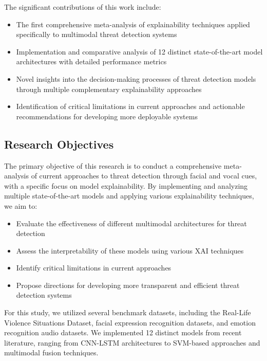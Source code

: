 \documentclass[conference,compsoc]{IEEEtran}
\begin{document}
The significant contributions of this work include:
\begin{itemize}
    \item The first comprehensive meta-analysis of explainability techniques applied specifically to multimodal threat detection systems
    \item Implementation and comparative analysis of 12 distinct state-of-the-art model architectures with detailed performance metrics
    \item Novel insights into the decision-making processes of threat detection models through multiple complementary explainability approaches
    \item Identification of critical limitations in current approaches and actionable recommendations for developing more deployable systems
\end{itemize}

\subsection{Research Objectives}
The primary objective of this research is to conduct a comprehensive meta-analysis of current approaches to threat detection through facial and vocal cues, with a specific focus on model explainability. By implementing and analyzing multiple state-of-the-art models and applying various explainability techniques, we aim to:

\begin{itemize}
    \item Evaluate the effectiveness of different multimodal architectures for threat detection
    \item Assess the interpretability of these models using various XAI techniques
    \item Identify critical limitations in current approaches
    \item Propose directions for developing more transparent and efficient threat detection systems
\end{itemize}

For this study, we utilized several benchmark datasets, including the Real-Life Violence Situations Dataset, facial expression recognition datasets, and emotion recognition audio datasets. We implemented 12 distinct models from recent literature, ranging from CNN-LSTM architectures to SVM-based approaches and multimodal fusion techniques.
\end{document}
